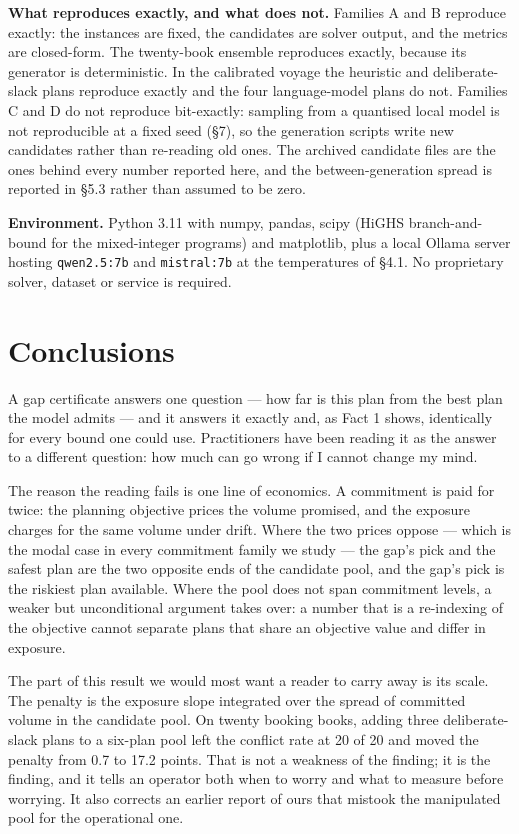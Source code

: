 \documentclass[preprint,12pt,letterpaper]{elsarticle}
\theoremstyle{definition}
\theoremstyle{plain}
\begin{document}
\textbf{What reproduces exactly, and what does not.} Families A and B reproduce exactly: the instances are fixed, the candidates are solver output, and the metrics are closed-form. The twenty-book ensemble reproduces exactly, because its generator is deterministic. In the calibrated voyage the heuristic and deliberate-slack plans reproduce exactly and the four language-model plans do not. Families C and D do not reproduce bit-exactly: sampling from a quantised local model is not reproducible at a fixed seed (\S 7), so the generation scripts write new candidates rather than re-reading old ones. The archived candidate files are the ones behind every number reported here, and the between-generation spread is reported in \S 5.3 rather than assumed to be zero.

\textbf{Environment.} Python 3.11 with numpy, pandas, scipy (HiGHS branch-and-bound for the mixed-integer programs) and matplotlib, plus a local Ollama server hosting \texttt{qwen2.5:7b} and \texttt{mistral:7b} at the temperatures of \S 4.1. No proprietary solver, dataset or service is required.

\section{Conclusions}

A gap certificate answers one question --- how far is this plan from the best plan the model admits --- and it answers it exactly and, as Fact 1 shows, identically for every bound one could use. Practitioners have been reading it as the answer to a different question: how much can go wrong if I cannot change my mind.

The reason the reading fails is one line of economics. A commitment is paid for twice: the planning objective prices the volume promised, and the exposure charges for the same volume under drift. Where the two prices oppose --- which is the modal case in every commitment family we study --- the gap's pick and the safest plan are the two opposite ends of the candidate pool, and the gap's pick is the riskiest plan available. Where the pool does not span commitment levels, a weaker but unconditional argument takes over: a number that is a re-indexing of the objective cannot separate plans that share an objective value and differ in exposure.

The part of this result we would most want a reader to carry away is its scale. The penalty is the exposure slope integrated over the spread of committed volume in the candidate pool. On twenty booking books, adding three deliberate-slack plans to a six-plan pool left the conflict rate at 20 of 20 and moved the penalty from 0.7 to 17.2 points. That is not a weakness of the finding; it is the finding, and it tells an operator both when to worry and what to measure before worrying. It also corrects an earlier report of ours that mistook the manipulated pool for the operational one.
\end{document}
